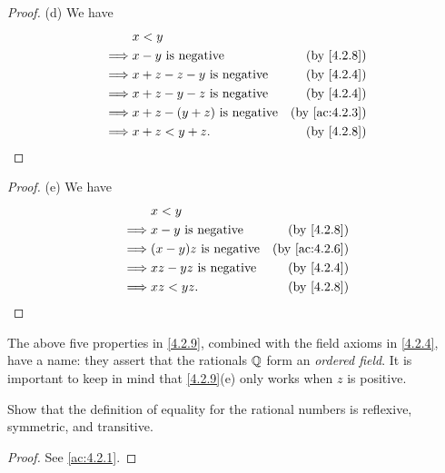 \begin{proof}{(d)}
  We have
  \begin{align*}
             & x < y                                                             \\
    \implies & x - y \text{ is negative}           & \text{(by \cref{4.2.8})}    \\
    \implies & x + z - z - y \text{ is negative}   & \text{(by \cref{4.2.4})}    \\
    \implies & x + z - y - z \text{ is negative}   & \text{(by \cref{4.2.4})}    \\
    \implies & x + z - (y + z) \text{ is negative} & \text{(by \cref{ac:4.2.3})} \\
    \implies & x + z < y + z.                      & \text{(by \cref{4.2.8})}
  \end{align*}
\end{proof}

\begin{proof}{(e)}
  We have
  \begin{align*}
             & x < y                                                      \\
    \implies & x - y \text{ is negative}    & \text{(by \cref{4.2.8})}    \\
    \implies & (x - y)z \text{ is negative} & \text{(by \cref{ac:4.2.6})} \\
    \implies & xz - yz \text{ is negative}  & \text{(by \cref{4.2.4})}    \\
    \implies & xz < yz.                     & \text{(by \cref{4.2.8})}
  \end{align*}
\end{proof}

\begin{rmk}\label{4.2.10}
  The above five properties in \cref{4.2.9}, combined with the field axioms in \cref{4.2.4}, have a name:
  they assert that the rationals \(\mathbb{Q}\) form an \emph{ordered field}.
  It is important to keep in mind that \cref{4.2.9}(e) only works when \(z\) is positive.
\end{rmk}

\exercisesection

\begin{ex}\label{ex:4.2.1}
  Show that the definition of equality for the rational numbers is reflexive, symmetric, and transitive.
\end{ex}

\begin{proof}
  See \cref{ac:4.2.1}.
\end{proof}

